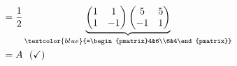 {\begin{enumerate}
\begin{align*}
	&=\frac{1}{2}\underbrace{\begin{pmatrix}1&1\\1&-1\end{pmatrix}\begin{pmatrix}5&5\\-1&1\end{pmatrix}}_{\textcolor{blue}{=\begin{pmatrix}4&6\\6&4\end{pmatrix}}}\\
	&=A~~(\checkmark)
	\end{align*}
\end{enumerate}
}
